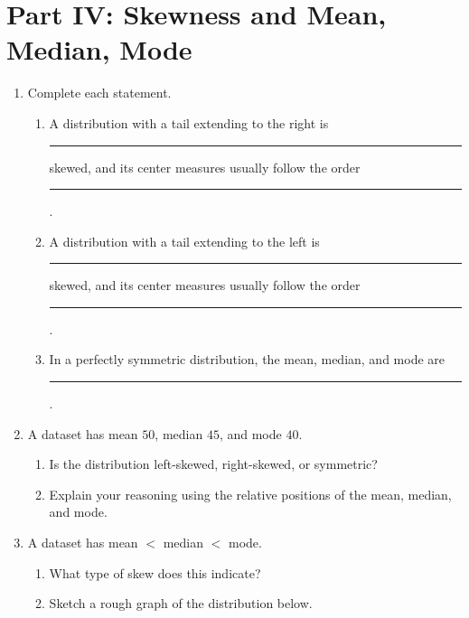 \documentclass[11pt]{article}
\newcommand{\blank}[1]{\rule{#1}{0.4pt}}
\newcommand{\answerline}{\vspace{1.2cm}}
\newcommand{\biganswer}{\vspace{2cm}}
\begin{document}
\section{Part IV: Skewness and Mean, Median, Mode}

\begin{enumerate}[leftmargin=*, label=\textbf{\arabic*.}, start=12]

\item Complete each statement.
\begin{enumerate}[label=(\alph*)]
    \item A distribution with a tail extending to the right is \blank{1.5in} skewed, and its center measures usually follow the order \blank{2in}. \answerline
    \item A distribution with a tail extending to the left is \blank{1.5in} skewed, and its center measures usually follow the order \blank{2in}. \answerline
    \item In a perfectly symmetric distribution, the mean, median, and mode are \blank{2in}. \answerline
\end{enumerate}

\item A dataset has mean $50$, median $45$, and mode $40$.
\begin{enumerate}[label=(\alph*)]
    \item Is the distribution left-skewed, right-skewed, or symmetric? \answerline
    \item Explain your reasoning using the relative positions of the mean, median, and mode. \biganswer
\end{enumerate}

\item A dataset has mean $<$ median $<$ mode.
\begin{enumerate}[label=(\alph*)]
    \item What type of skew does this indicate? \answerline
    \item Sketch a rough graph of the distribution below.
\end{enumerate}

\vspace{0.5em}
\begin{center}
\end{center}


\end{enumerate}
\end{document}

